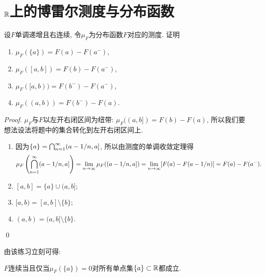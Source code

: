 \section{$\mathbb{R}$上的博雷尔测度与分布函数}
\begin{exercise}
    设$F$单调递增且右连续, 令$\mu_F$为分布函数$F$对应的测度. 证明
    \begin{enumerate}
    \item $\mu_F(\{a\})=F(a)-F(a^-)$,
    \item $\mu_F([a,b])=F(b)-F(a^-)$,
    \item $\mu_F([a,b))=F(b^-) - F(a^-)$,
    \item $\mu_F((a,b))=F(b^-)-F(a)$. 
    \end{enumerate}
\end{exercise}
\begin{proof}
    $\mu_F$与$F$以左开右闭区间为纽带: $\mu_F((a,b]) = F(b)-F(a)$, 所以我们要想法设法将题中的集合转化到左开右闭区间上. 
    \begin{enumerate}
    \item 因为$\{a\} = \bigcap_{n=1}^{\infty}(a-1/n, a]$, 所以由测度的单调收敛定理得
    $$\mu_F\left(\bigcap_{n=1}^{\infty}(a-1/n, a]\right) = \lim_{n \to \infty}\mu_F((a-1/n,a])
    = \lim_{n \to \infty}[F(a)-F(a-1/n)] = F(a) - F(a^-). $$
    \item $[a,b] = \{a\} \cup (a,b]$;
    \item $[a,b) = [a,b] \setminus \{b\}$;
    \item $(a,b) = (a,b] \setminus \{b\}$.
    \end{enumerate} \qed 
\end{proof}
由该练习立刻可得:
\begin{exercise}
    $F$连续当且仅当$\mu_F(\{a\}) = 0$对所有单点集$\{a\} \subset \mathbb{R}$都成立. 
\end{exercise}

